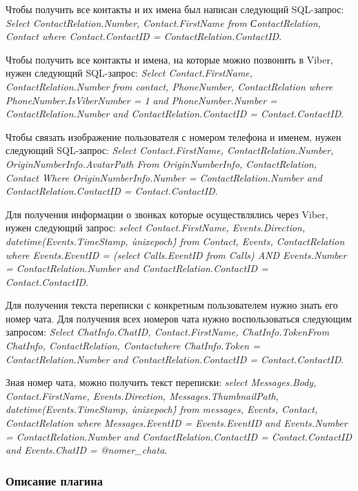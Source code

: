 Чтобы получить все контакты и их имена был написан следующий SQL-запрос: 
\textit{Select ContactRelation.Number, Contact.FirstName from СontactRelation, Contact where Contact.ContactID = ContactRelation.ContactID}.

Чтобы получить все контакты и имена, на которые можно позвонить в Viber, нужен следующий SQL-запрос: 
\textit{Select Contact.FirstName, ContactRelation.Number from contact, PhoneNumber, ContactRelation where PhoneNumber.IsViberNumber = 1 and PhoneNumber.Number = ContactRelation.Number and ContactRelation.ContactID = Contact.ContactID}.

Чтобы связать изображение пользователя с номером телефона и именем, нужен следующий SQL-запрос:
\textit{Select Contact.FirstName, ContactRelation.Number, OriginNumberInfo.AvatarPath From OriginNumberInfo, ContactRelation, Contact Where OriginNumberInfo.Number = ContactRelation.Number and ContactRelation.ContactID = Contact.ContactID}.

Для получения информации о звонках которые осуществлялись через Viber, нужен следующий запрос: 
\textit{select Contact.FirstName, Events.Direction, datetime(Events.TimeStamp, \`unixepoch\') from Contact, Events, ContactRelation where Events.EventID = (select Calls.EventID from Calls) AND Events.Number = ContactRelation.Number and ContactRelation.ContactID = Contact.ContactID}.

Для получения текста переписки с конкретным пользователем нужно знать его номер чата. Для получения всех номеров чата нужно воспользоваться следующим запросом: 
\textit{Select ChatInfo.ChatID, Contact.FirstName, ChatInfo.TokenFrom ChatInfo, ContactRelation, Contactwhere ChatInfo.Token = ContactRelation.Number and ContactRelation.ContactID = Contact.ContactID}.

Зная номер чата, можно получить текст переписки: 
\textit{select Messages.Body, Contact.FirstName, Events.Direction, Messages.ThumbnailPath, datetime(Events.TimeStamp, \`unixepoch\') from messages, Events, Contact, ContactRelation where Messages.EventID = Events.EventID and Events.Number = ContactRelation.Number and ContactRelation.ContactID = Contact.ContactID and Events.ChatID = @nomer\_chata}.

\subsubsection{Описание плагина}

